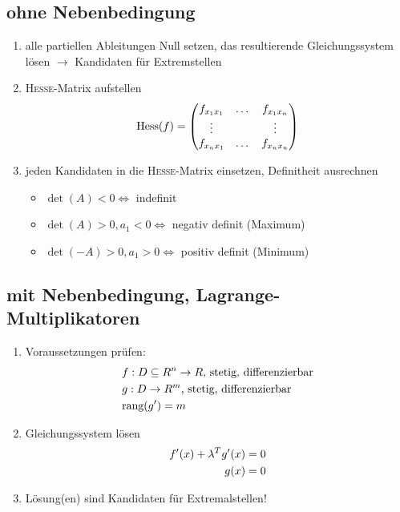 \documentclass[ngerman,a4paper]{article}
\begin{document}
\subsection{ohne Nebenbedingung}
\begin{enumerate}[label=\textbf{\arabic*.}]
	\item alle partiellen Ableitungen Null setzen, das resultierende Gleichungssystem lösen $\to$ Kandidaten für Extremstellen
	\item \textsc{Hesse}-Matrix aufstellen
	\begin{align}
		\text{Hess}(f)=\begin{pmatrix}f_{x_1x_1} & \dots & f_{x_1x_n} \\ \vdots & & \vdots \\ f_{x_nx_1} & \dots & f_{x_nx_n}\end{pmatrix}\notag
	\end{align}
	\item jeden Kandidaten in die \textsc{Hesse}-Matrix einsetzen, Definitheit ausrechnen
	\begin{itemize}
		\item $\det(A)<0\Leftrightarrow$ indefinit
		\item $\det(A)>0, a_1<0\Leftrightarrow$ negativ definit (Maximum)
		\item $\det(-A)>0, a_1>0\Leftrightarrow$ positiv definit (Minimum)
	\end{itemize}
\end{enumerate}

\subsection{mit Nebenbedingung, Lagrange-Multiplikatoren}
	\begin{enumerate}[label=\textbf{\arabic*.}]
		\item Voraussetzungen prüfen: 
		\begin{align}
			& f:D\subseteq R^n\to R\text{, stetig, differenzierbar} \notag \\
			& g: D\to R^m\text{, stetig, differenzierbar}\notag \\
			&\text{rang}(g')=m \notag
		\end{align}
		\item Gleichungssystem lösen
		\begin{align}
			f'(x) + \lambda^Tg'(x)&=0\notag \\
			g(x) &= 0\notag 
		\end{align}
		\item Lösung(en) sind Kandidaten für Extremalstellen!
	\end{enumerate}
\end{document}
